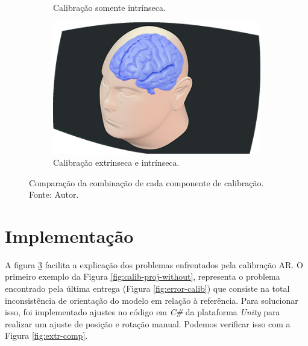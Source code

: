 \begin{figure}[H]
\begin{subfigure}{.4\textwidth}
        \caption{Calibração somente intrínseca.}
        \label{fig:calib-proj-intr}
    \end{subfigure}
    \begin{subfigure}{.4\textwidth}
        \centering
        \includegraphics[width=.65\textwidth]{figuras/Calib.png}
        \caption{Calibração extrínseca e intrínseca.}
        \label{fig:calib-proj}
    \end{subfigure}
    \caption{Comparação da combinação de cada componente de calibração. Fonte: Autor.}
    \label{fig:calib-proj-comp}
\end{figure}

\section{Implementação}\label{chp:impl}

A figura \ref{fig:calib-proj-comp} facilita a explicação dos problemas enfrentados pela calibração AR. O primeiro exemplo da Figura \ref{fig:calib-proj-without}, representa o problema encontrado pela última entrega (Figura \ref{fig:error-calib}) que consiste na total inconsistência de orientação do modelo em relação à referência. Para solucionar isso, foi implementado ajustes no código em \textit{C\#} da plataforma \textit{Unity} para realizar um ajuste de posição e rotação manual. Podemos verificar isso com a Figura \ref{fig:extr-comp}.

